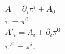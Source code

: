 \begin{equation}
  \begin{array}{l}
  A=\partial_i \pi^i +A_0 \\ \pi=\pi^0 \\  A' _i =A_i + \partial_i \pi^0 \\ \pi'^i
  = \pi^i.
  \end{array}
  \label{a43}
  \end{equation}

